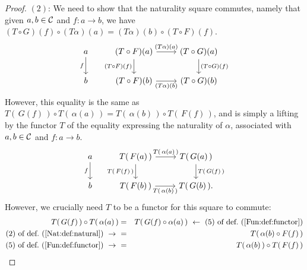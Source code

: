 \begin{proof}
    $(2)$: We need to show that the naturality square commutes, namely that
    given $a,b\in\mbox{$\cal C$}$ and $f:a\to b$, we have $(T\circ G)(f)\circ(T\alpha)(a)
    =(T\alpha)(b)\circ(T\circ F)(f)$.
    \[
        \begin{tikzcd}
            a\arrow[d,swap, "f"]
            &(T\circ F)(a)\arrow[r, "(T\alpha)(a)"]\arrow[d, swap,"(T\circ F)(f)"]
            &(T\circ G)(a)\arrow[d, "(T\circ G)(f)"]
            \\
            b
            &(T\circ F)(b)\arrow[r, swap, "(T\alpha)(b)"]
            &(T\circ G)(b)
        \end{tikzcd}
    \]
    However, this equality is the same as $T(\,G(f)\,)\circ T(\,\alpha(a)\,)
    =T(\,\alpha(b)\,)\circ T(\,F(f)\,)$, and is simply a lifting by the 
    functor $T$ of the equality expressing the naturality of $\alpha$, 
    associated with $a,b\in\mbox{$\cal C$}$ and $f:a\to b$.
    \[
        \begin{tikzcd}
            a\arrow[d,swap, "f"]
            &T(\,F(a)\,)\arrow[r, "T(\,\alpha(a)\,)"]\arrow[d, swap,"T(\,F(f)\,)"]
            &T(\,G(a)\,)\arrow[d, "T(\,G(f)\,)"]
            \\
            b
            &T(\,F(b)\,)\arrow[r, swap, "T(\,\alpha(b)\,)"]
            &T(\,G(b)\,).
        \end{tikzcd}
    \]
    However, we crucially need $T$ to be a functor for this square to commute:
    \begin{eqnarray*}T(\,G(f)\,)\circ T(\,\alpha(a)\,)
        &=&T(\,G(f)\circ\alpha(a)\,)
        \ \leftarrow\ \mbox{$(5)$ of def.~(\ref{Fun:def:functor})}\\
        \mbox{$(2)$ of def.~(\ref{Nat:def:natural})}\ \to\ 
        &=&T(\,\alpha(b)\circ F(f)\,)\\
        \mbox{$(5)$ of def.~(\ref{Fun:def:functor})}\ \to\ 
        &=&T(\,\alpha(b)\,)\circ T(\,F(f)\,)
    \end{eqnarray*}
\end{proof}
